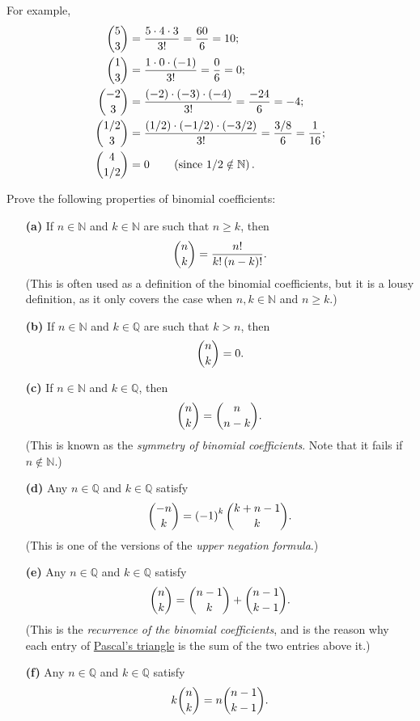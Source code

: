 \documentclass[paper=a4, fontsize=12pt]{scrartcl} %
\newcommand{\QQ}{\mathbb{Q}} %
\newcommand{\NN}{\mathbb{N}} %
\newcommand{\tup}[1]{\left( #1 \right)}
\theoremstyle{plainsl}
\theoremstyle{definition}
\theoremstyle{remark}
\begin{document}
For example,
\begin{align*}
\dbinom{5}{3} &= \dfrac{5 \cdot 4 \cdot 3}{3!} = \dfrac{60}{6} = 10; \\
\dbinom{1}{3} &= \dfrac{1 \cdot 0 \cdot \tup{-1}}{3!} = \dfrac{0}{6} = 0; \\
\dbinom{-2}{3} &= \dfrac{\tup{-2} \cdot \tup{-3} \cdot \tup{-4}}{3!} = \dfrac{-24}{6} = -4; \\
\dbinom{1/2}{3} &= \dfrac{\tup{1/2} \cdot \tup{-1/2} \cdot \tup{-3/2}}{3!} = \dfrac{3/8}{6} = \dfrac{1}{16}; \\
\dbinom{4}{1/2} &= 0 \qquad \tup{\text{since $1/2 \notin \NN$}} .
\end{align*}

Prove the following properties of binomial coefficients:

\begin{enumerate}

\item[\textbf{(a)}]
If $n \in \NN$ and $k \in \NN$ are such that $n \geq k$,
then
\[
\dbinom{n}{k}
= \dfrac{n!}{k! \tup{n-k}!} .
\]
(This is often used as a definition of the binomial coefficients,
but it is a lousy definition, as it
only covers the case when $n, k \in \NN$ and $n \geq k$.)

\item[\textbf{(b)}]
If $n \in \NN$ and $k \in \QQ$ are such that $k > n$, then
\[
\dbinom{n}{k} = 0.
\]

\item[\textbf{(c)}]
If $n \in \NN$ and $k \in \QQ$, then
\begin{align}
\dbinom{n}{k} = \dbinom{n}{n-k} .
\label{eq.exe.binom.101.c}
\end{align}
(This is known as the \textit{symmetry of binomial coefficients}.
Note that it fails if $n \notin \NN$.)

\item[\textbf{(d)}]
Any $n \in \QQ$ and $k \in \QQ$ satisfy
\begin{align}
\dbinom{-n}{k} = \tup{-1}^k \dbinom{k + n - 1}{k} .
\label{eq.exe.binom.101.d}
\end{align}
(This is one of the versions of the \textit{upper negation formula}.)

\item[\textbf{(e)}]
Any $n \in \QQ$ and $k \in \QQ$ satisfy
\begin{align}
\dbinom{n}{k} = \dbinom{n-1}{k} + \dbinom{n-1}{k-1} .
\label{eq.exe.binom.101.e}
\end{align}
(This is the \textit{recurrence of the binomial coefficients},
and is the reason why each entry of
\href{https://en.wikipedia.org/wiki/Pascal%27s_triangle}{Pascal's triangle}
is the sum of the two entries above it.)

\item[\textbf{(f)}]
Any $n \in \QQ$ and $k \in \QQ$ satisfy
\begin{align}
k \dbinom{n}{k} = n \dbinom{n-1}{k-1} .
\label{eq.exe.binom.101.f}
\end{align}

\end{enumerate}
\end{document}
